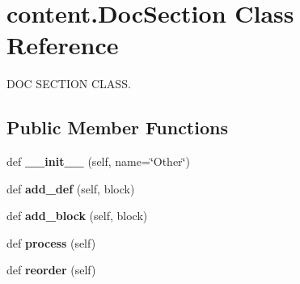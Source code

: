 \hypertarget{classcontent_1_1_doc_section}{}\section{content.\+Doc\+Section Class Reference}
\label{classcontent_1_1_doc_section}


D\+OC S\+E\+C\+T\+I\+ON C\+L\+A\+SS.  


\subsection*{Public Member Functions}
\begin{DoxyCompactItemize}
\item 
\mbox{\label{classcontent_1_1_doc_section_a1389757afe38b9898b5cf4de4a018bd6}} 
def {\bfseries \+\_\+\+\_\+init\+\_\+\+\_\+} (self, name=\char`\"{}Other\char`\"{})
\item 
\mbox{\label{classcontent_1_1_doc_section_a5133093b86b3fd50704855238815e3ef}} 
def {\bfseries add\+\_\+def} (self, block)
\item 
\mbox{\label{classcontent_1_1_doc_section_a440c733dacc9a97041c551a3a9aed217}} 
def {\bfseries add\+\_\+block} (self, block)
\item 
\mbox{\label{classcontent_1_1_doc_section_aabd75dff1c6ef88d3168e100cb19b924}} 
def {\bfseries process} (self)
\item 
\mbox{\label{classcontent_1_1_doc_section_a934270932ad675acddee9f09b1e8af80}} 
def {\bfseries reorder} (self)
\end{DoxyCompactItemize}
